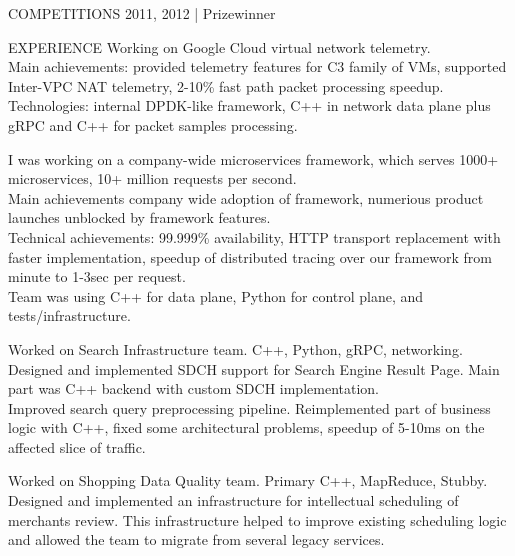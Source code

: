 \documentclass[12pt]{cutecv}
\begin{document}
\begin{paracol}{2}
\begin{leftcolumn}
\begin{cvsection}{COMPETITIONS}
  {2011, 2012 | Prizewinner}
  {}
\end{cvsection}

\end{leftcolumn}

\begin{rightcolumn}
\begin{cvsection}{EXPERIENCE}
  {Working on Google Cloud virtual network telemetry. \\
  Main achievements: provided telemetry features for C3 family of VMs, supported Inter-VPC NAT telemetry, 2-10\% fast path packet processing speedup. \\
  Technologies: internal DPDK-like framework, C++ in network data plane plus gRPC and C++ for packet samples processing.}
  
  {I was working on a company-wide microservices framework, which serves
  1000+ microservices, 10+ million requests per second.\\
  Main achievements company wide adoption of framework, 
  numerious product launches unblocked by framework features. \\
  Technical achievements: 99.999\% availability, HTTP transport replacement
  with faster implementation, speedup of distributed tracing over our
  framework from minute to 1-3sec per request. \\
  Team was using C++ for data plane, Python for control plane, and tests/infrastructure.}

  {Worked on Search Infrastructure team. C++, Python, gRPC, networking.
  Designed and implemented SDCH support for Search Engine Result Page.
  Main part was C++ backend with custom SDCH implementation.\\
  Improved search query preprocessing pipeline. Reimplemented part of business logic with C++, 
  fixed some architectural problems, speedup of 5-10ms on the affected slice of traffic.}
  
  {Worked on Shopping Data Quality team. Primary C++, MapReduce, Stubby.
   Designed and implemented an infrastructure for intellectual scheduling of merchants review. This infrastructure helped to improve existing scheduling logic
   and allowed the team to migrate from several legacy services.}
  

\end{cvsection}
\end{rightcolumn}
\end{paracol}
\end{document}

